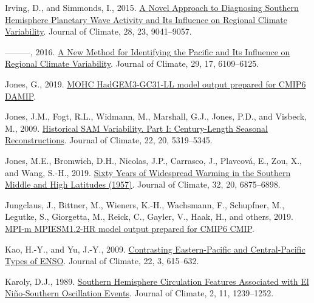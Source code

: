 \documentclass[12pt,oneside]{reedthesis}
\newlength{\cslhangindent}
\newenvironment{CSLReferences}[2] %
 {%
  \setlength{\parindent}{0pt}
  \ifodd #1 \everypar{\setlength{\hangindent}{\cslhangindent}}\ignorespaces\fi
  \ifnum #2 > 0
  \setlength{\parskip}{#2\baselineskip}
  \fi
 }%
 {}
\begin{document}
\begin{CSLReferences}{1}{0}
\leavevmode{}%
Irving, D., and Simmonds, I., 2015. \href{https://doi.org/10.1175/JCLI-D-15-0287.1}{A {Novel Approach} to {Diagnosing Southern Hemisphere Planetary Wave Activity} and {Its Influence} on {Regional Climate Variability}}. Journal of Climate, 28, 23, 9041--9057.

\leavevmode{}%
---------, 2016. \href{https://doi.org/10.1175/JCLI-D-15-0843.1}{A {New Method} for {Identifying} the {Pacific} and {Its Influence} on {Regional Climate Variability}}. Journal of Climate, 29, 17, 6109--6125.

\leavevmode{}%
Jones, G., 2019. \href{https://doi.org/10.22033/ESGF/CMIP6.471}{MOHC HadGEM3-GC31-LL model output prepared for CMIP6 DAMIP}.

\leavevmode{}%
Jones, J.M., Fogt, R.L., Widmann, M., Marshall, G.J., Jones, P.D., and Visbeck, M., 2009. \href{https://doi.org/10.1175/2009JCLI2785.1}{Historical {SAM Variability}. {Part I}: {Century-Length Seasonal Reconstructions}}. Journal of Climate, 22, 20, 5319--5345.

\leavevmode{}%
Jones, M.E., Bromwich, D.H., Nicolas, J.P., Carrasco, J., Plavcová, E., Zou, X., and Wang, S.-H., 2019. \href{https://doi.org/10.1175/JCLI-D-18-0565.1}{Sixty {Years} of {Widespread Warming} in the {Southern Middle} and {High Latitudes} (1957)}. Journal of Climate, 32, 20, 6875--6898.

\leavevmode{}%
Jungclaus, J., Bittner, M., Wieners, K.-H., Wachsmann, F., Schupfner, M., Legutke, S., Giorgetta, M., Reick, C., Gayler, V., Haak, H., and others, 2019. \href{https://doi.org/10.22033/ESGF/CMIP6.741}{MPI-m MPIESM1.2-HR model output prepared for CMIP6 CMIP}.

\leavevmode{}%
Kao, H.-Y., and Yu, J.-Y., 2009. \href{https://doi.org/10.1175/2008JCLI2309.1}{Contrasting {Eastern-Pacific} and {Central-Pacific Types} of {ENSO}}. Journal of Climate, 22, 3, 615--632.

\leavevmode{}%
Karoly, D.J., 1989. \href{https://doi.org/10.1175/1520-0442(1989)002\%3C1239:SHCFAW\%3E2.0.CO;2}{Southern {Hemisphere Circulation Features Associated} with {El Niño-Southern Oscillation Events}}. Journal of Climate, 2, 11, 1239--1252.


\end{CSLReferences}
\end{document}
